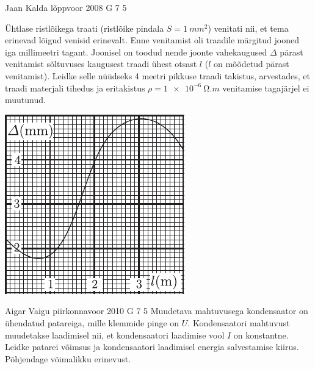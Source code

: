 \documentclass[11pt, twoside]{article}
\begin{document}
{%
{Jaan Kalda} %
{lõppvoor} %
{2008} %
{G 7} %
{5} %
{
\ifStatement
Ühtlase ristlõikega traati (ristlõike pindala $S = \SI{1}{mm^2}$) venitati nii, et tema erinevad lõigud venisid erinevalt. Enne venitamist oli traadile märgitud jooned iga millimeetri tagant. Joonisel on toodud nende joonte vahekaugused $\Delta$ pärast venitamist sõltuvuses kaugusest traadi ühest otsast $l$ ($l$ on mõõdetud pärast venitamist). Leidke selle nüüdseks 4 meetri pikkuse traadi takistus, arvestades, et traadi materjali tihedus ja eritakistus $\rho = \SI{1e-6}{\ohm.m}$ venitamise tagajärjel ei muutunud.

\begin{center}
	\includegraphics[width=0.6\linewidth]{2008-v3g-07-yl}
\end{center}
\fi
}

{Aigar Vaigu} %
{piirkonnavoor} %
{2010} %
{G 7} %
{5} %
{
\ifStatement
Muudetava mahtuvusega kondensaator on ühendatud patareiga,
mille klemmide pinge on $U$. Kondensaatori mahtuvust muudetakse laadimisel nii, et
kondensaatori laadimise vool $I$ on konstantne. Leidke patarei võimsus ja kondensaatori laadimisel energia salvestamise kiirus.
Põhjendage võimalikku erinevust.
\fi
}
\newpage


}
\end{document}
